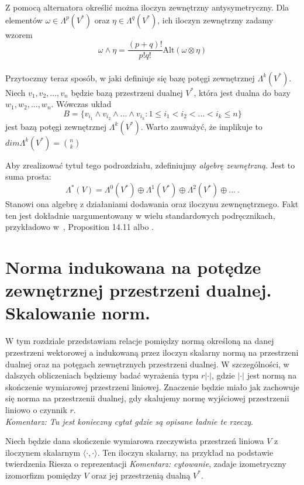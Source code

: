 \documentclass[licencjacka]{pracamgr}
\theoremstyle{definition}
\theoremstyle{definition}
\theoremstyle{plain}
\theoremstyle{plain}
\theoremstyle{plain}
\theoremstyle{plain}
\begin{document}
Z pomocą alternatora określić można iloczyn zewnętrzny antysymetryczny. 
Dla elementów $\omega \in \Lambda^p (V^\ast)$ oraz 
$\eta \in \Lambda^q (V^\ast)$, ich iloczyn zewnętrzny zadamy wzorem
\[
  \omega \wedge \eta = \frac{(p+q)!}{p!q!} \text{Alt} (\omega \otimes \eta)
\] \\

Przytoczmy teraz sposób, w jaki definiuje się bazę potęgi zewnętrznej
$\Lambda^k(V^\ast)$. Niech $v_1, v_2, ... , v_n$ będzie bazą przestrzeni dualnej
$V^\ast$, która jest dualna do bazy $w_1, w_2, ..., w_n$.
Wówczas układ
\[
  B = \{ v_{i_1} \wedge v_{i_2} \wedge ... \wedge v_{i_k} : 1 \leq i_1 < i_2 < ... <i_k \leq n \}
\]
jest bazą potęgi zewnętrznej $\Lambda^k(V^\ast)$. Warto zauważyć, że implikuje
 to $dim \Lambda^k ( V^\ast)= \binom{n}{k}$

Aby zrealizować tytuł tego podrozdziału, zdefiniujmy
\emph{algebrę zewnętrzną}. Jest to suma prosta:
\[
\Lambda^\ast (V) = 
\Lambda^0(V^\ast) \oplus
\Lambda^1(V^\ast) \oplus
\Lambda^2(V^\ast) \oplus
...~.
\] Stanowi ona algebrę z działaniami dodawania oraz iloczynu zewnęnętrznego.
Fakt ten jest dokładnie uargumentowany w wielu standardowych podręcznikach,
przykładowo w~\cite{lee}, Proposition 14.11 albo \cite{kostrikin}.\\


\section{Norma indukowana na potędze zewnętrznej przestrzeni dualnej.
Skalowanie norm.}

W tym rozdziale przedstawiam relacje pomiędzy normą określoną na danej
przestrzeni wektorowej a indukowaną przez iloczyn skalarny normą na przestrzeni
dualnej oraz na potęgach zewnętrznych przestrzeni dualnej.  W szczególności, w
dalszych obliczeniach będziemy badać wyrażenia typu $r |\cdot|$, gdzie
$|\cdot|$ jest normą na skończenie wymiarowej przestrzeni liniowej.  Znaczenie
będzie miało jak zachowuje się norma na przestrzenii dualnej, gdy skalujemy
normę wyjściowej przestrzenii liniowo o czynnik $r$. \\

\emph{Komentarz: Tu jest konieczny cytat gdzie są opisane ładnie te rzeczy}.

Niech będzie dana skończenie wymiarowa rzeczywista przestrzeń liniowa $V$ z
iloczynem skalarnym $\langle \cdot, \cdot \rangle$.
Ten iloczyn skalarny, na przykład na podstawie twierdzenia Riesza o
reprezentacji \emph{Komentarz: cytowanie}, zadaje izometryczny izomorfizm
pomiędzy $V$ oraz jej przestrzenią dualną $V^\ast$.
\end{document}

